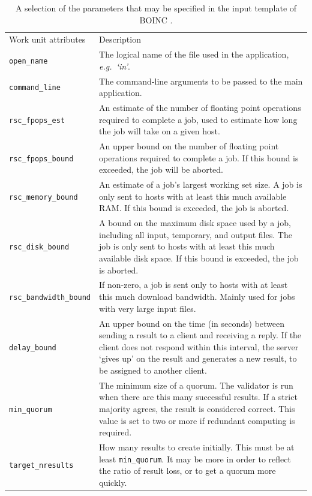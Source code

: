\begin{table} 
\caption{A selection of the parameters that may be specified in the input template of BOINC \cite{boincwiki}. }
\begin{tabular}{lp{11.5cm}}\toprule
Work unit attributes & Description \cite{boincwiki} \\ \cmidrule(r){1-2}
\verb|open_name| & The logical name of the file used in the application, \emph{e.g.\ `in'}.\\
\verb|command_line| & The command-line arguments to be passed to the main  application.  \\
\verb|rsc_fpops_est| &
An estimate of the number of floating point operations required to complete a job, used to estimate how long the job will take on a given host.\\
\verb|rsc_fpops_bound| &
An upper bound on the number of floating point operations required to complete a job. If this bound is exceeded, the job will be aborted.\\
\verb|rsc_memory_bound| &
An estimate of a job's largest working set size. A job is only sent to hosts with at least this much available RAM. If this bound is exceeded, the job is aborted.\\
\verb|rsc_disk_bound| &
A bound on the maximum disk space used by a job, including all input, temporary, and output files. The job is only   sent to hosts with at least this much available disk space. If this bound is exceeded, the job is aborted.\\
\verb|rsc_bandwidth_bound| &
If non-zero, a job is sent only to hosts with at least this much download bandwidth. Mainly used for jobs with very large input files. \\
\verb|delay_bound| &An upper bound on the time (in seconds) between sending a result to a client and receiving a reply.  If the client does not respond within this interval, the server `gives up' on the result and generates a new result, to be assigned to another client.  
\\
\verb|min_quorum| &
The minimum size of a quorum. The validator is run when there are this many successful results. If a strict majority agrees, the result is considered correct. This value is set to two or more if redundant computing is required.
\\
\verb|target_nresults| &
How many results to create initially. This must be at least \verb|min_quorum|. It may be more in order to reflect the ratio of result loss, or to get a quorum more quickly.
\\

\end{tabular}
\end{table}
